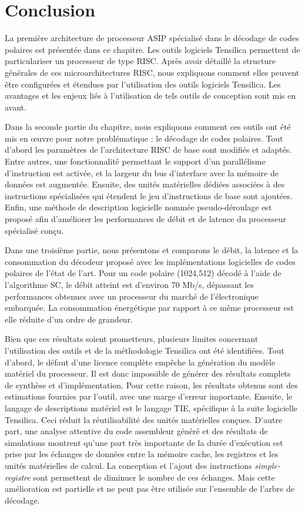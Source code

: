 \section*{Conclusion}

La première architecture de processeur ASIP spécialisé dans le décodage de codes polaires est présentée dans ce chapitre. Les outils logiciels Tensilica permettent de particulariser un processeur de type RISC. Après avoir détaillé la structure générales de ces microarchitectures RISC, nous expliquons comment elles peuvent être configurées et étendues par l'utilisation des outils logiciels Tensilica. Les avantages et les enjeux liés à l'utilisation de tels outils de conception sont mis en avant.

Dans la seconde partie du chapitre, nous expliquons comment ces outils ont été mis en œuvre pour notre problématique : le décodage de codes polaires. Tout d'abord les paramètres de l'architecture RISC de base sont modifiés et adaptés. Entre autres, une fonctionnalité permettant le support d'un parallélisme d'instruction est activée, et la largeur du bus d'interface avec la mémoire de données est augmentée. Ensuite, des unités matérielles dédiées associées à des instructions spécialisées qui étendent le jeu d'instructions de base sont ajoutées. Enfin, une méthode de description logicielle nommée \og pseudo-déroulage \fg est proposé afin d'améliorer les performances de débit et de latence du processeur spécialisé conçu.

Dans une troisième partie, nous présentons et comparons le débit, la latence et la consommation du décodeur proposé avec les implémentations logicielles de codes polaires de l'état de l'art. Pour un code polaire (1024,512) décodé à l'aide de l'algorithme SC, le débit atteint est d'environ 70 Mb/s, dépassant les performances obtenues avec un processeur du marché de l'électronique embarquée. La consommation énergétique par rapport à ce même processeur est elle réduite d'un ordre de grandeur.

Bien que ces résultats soient prometteurs, plusieurs limites concernant l'utilisation des outils et de la méthodologie Tensilica ont été identifiées. Tout d'abord, le défaut d'une licence complète empêche la génération du modèle matériel du processeur. Il est donc impossible de générer des résultats complets de synthèse et d'implémentation. Pour cette raison, les résultats obtenus sont des estimations fournies par l'outil, avec une marge d'erreur importante. Ensuite, le langage de descriptions matériel est le langage TIE, spécifique à la suite logicielle Tensilica. Ceci réduit la réutilisabilité des unités matérielles conçues. D'autre part, une analyse attentive du code assembleur généré et des résultats de simulations montrent qu'une part très importante de la durée d'exécution est prise par les échanges de données entre la mémoire cache, les registres et les unités matérielles de calcul. La conception et l'ajout des instructions \textit{simple-registre} sont permettent de diminuer le nombre de ces échanges. Mais cette amélioration est partielle et ne peut pas être utilisée sur l'ensemble de l'arbre de décodage.

